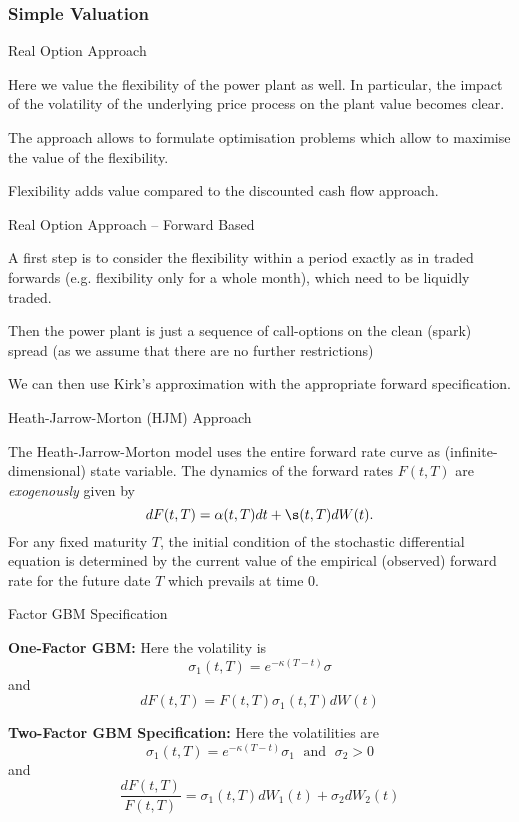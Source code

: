 \subsubsection{Simple Valuation}

{Real Option Approach}


	Here we value the flexibility of the power plant as well. In particular, the impact of the volatility of the underlying price process on the plant value becomes clear.

	The approach allows to formulate optimisation problems which allow to maximise the value of the flexibility.

	Flexibility adds value compared to the discounted cash flow approach.


{Real Option Approach -- Forward Based}


	A first step is to consider the flexibility within a period exactly as in traded forwards (e.g. flexibility only for a whole month), which need to be liquidly traded.

	Then the power plant is just a sequence of call-options on the clean (spark) spread
(as we assume that there are no further restrictions)

	We can then use Kirk's approximation with the appropriate forward specification.


{Heath-Jarrow-Morton (HJM) Approach}

The Heath-Jarrow-Morton model uses the entire forward rate curve as
(infinite-dimensional) state variable. The dynamics of the forward rates $F(t,T)$ are {\it exogenously} given by
$$
dF(t,T) = \alpha(t,T) dt + \s(t,T) dW(t).
$$
For any fixed maturity $T$, the
initial condition of the stochastic differential equation
is determined by the current value
of the empirical (observed) forward rate for the future date $T$
which prevails at time $0$.

{Factor GBM Specification}


	{\bf One-Factor GBM:} Here the volatility is
$$
\sigma_1(t,T)=e^{-\kappa (T-t)}\sigma
$$
and
$$
dF(t,T)=F(t,T)\sigma_1(t,T)dW(t)
$$

	{\bf Two-Factor GBM Specification:}
Here the volatilities are
$$
\sigma_1(t,T)=e^{-\kappa (T-t)}\sigma_1 \; \mbox{ and } \; \sigma_2>0
$$
and
$$
\frac{dF(t,T)}{F(t,T)}=\sigma_1(t,T)dW_1(t)+\sigma_2dW_2(t)
$$

